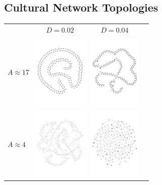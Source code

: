 \documentclass[paperwidth=42in, paperheight=33.1in,landscape,showframe,fontscale=.42]{baposter}
\begin{document}
\begin{poster}
{		    \subsection*{ Cultural Network Topologies}


		    \begin{center}
			\begin{tabular}{lccc}
			    &$D=0.02$ & $D=0.04$\\
			    $A\approx17$&
			    \includegraphics[width=2.5cm]{img/g02.pdf}&
			    \includegraphics[width=2.5cm]{img/g00.pdf}\\
			    $A\approx4$&
			    \includegraphics[width=2.5cm]{img/g42.pdf}&
			    \includegraphics[width=2.5cm]{img/g40.pdf}\\
			\end{tabular}

		    \end{center}


}
\end{poster}
\end{document}
